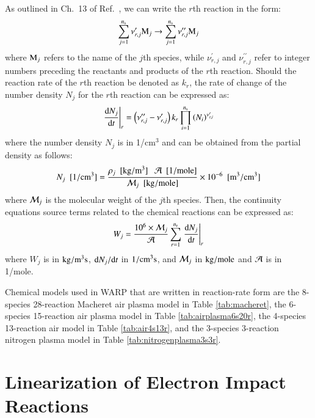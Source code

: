 \documentclass{warpdoc}
\newcommand{\ns}{{{n}_{\rm s}}}
\newcommand{\nr}{{{n}_{\rm r}}}
\let\citen\cite
\begin{document}
As outlined in Ch.\ 13 of Ref.\ \citen{book:1989:anderson}, we can write the $r$th reaction in the form:
%
\begin{equation}
  \sum_{j=1}^\ns {\nu^\prime_{r,j}} {\rm M}_j \rightarrow \sum_{j=1}^\ns {\nu^{\prime\prime}_{r,j}} {\rm M}_j
\end{equation}
%
where ${\rm M}_j$ refers to the name of the $j$th species, while $\nu^\prime_{r,j}$ and $\nu^{\prime\prime}_{r,j}$
refer to integer numbers preceding the reactants and products of the $r$th reaction. 
 Should the reaction rate of the $r$th reaction be denoted as ${k}_r$,
the rate of change of the number density $N_{j}$ for the $r$th reaction can be expressed as:
%
\begin{equation}
\left.  \frac{{\rm d} N_{j}}{{\rm d} t}\right|_r  =  \left( \nu^{\prime\prime}_{r,j} - \nu^\prime_{r,j} \right) {k}_r \prod_{i=1}^\ns {\left( N_{i} \right)}^{\nu^\prime_{r,i}}
\end{equation}
%
where the number density $N_{j}$ is in  1/cm$^3$ and can be obtained from the partial density as follows:
%
\begin{equation}
  N_{j} {\rm ~~[1/cm^3]}= \frac{\rho_j {\rm ~~[kg/m^3]}~~~{\cal A ~~{\rm [1/mole]}}}{{\cal M}_j {\rm ~~[kg/mole]}} \times 10^{-6} {\rm ~~[m^3/cm^3]}
\end{equation}
%
where ${\cal M}_j$ is the molecular weight of the $j$th species. 
Then, the continuity equations source terms related to the chemical reactions can be expressed as:
%
\begin{equation}
 W_j  = \frac{10^6 \times {\cal M}_j}{\cal A} \sum_{r=1}^{\nr} \left. \frac{{\rm d} N_{j}}{{\rm d} t} \right|_r     
\end{equation}
%
where $W_j$ is in $\rm kg/m^3 s$, ${{\rm d} N_j}/{{\rm d} t}$ in $\rm 1/cm^3 s$, and ${\cal M}_j$ in $\rm kg/mole$ and $\cal A$ is in 1/mole.

Chemical models used in WARP that are written in reaction-rate form are the 8-species 28-reaction Macheret air plasma model in Table \ref{tab:macheret}, the 6-species 15-reaction air plasma model in Table \ref{tab:airplasma6s20r}, the 4-species 13-reaction air model in Table \ref{tab:air4s13r}, and the 3-species 3-reaction nitrogen plasma model in Table \ref{tab:nitrogenplasma3s3r}.



\section{Linearization of Electron Impact Reactions}
\end{document}
